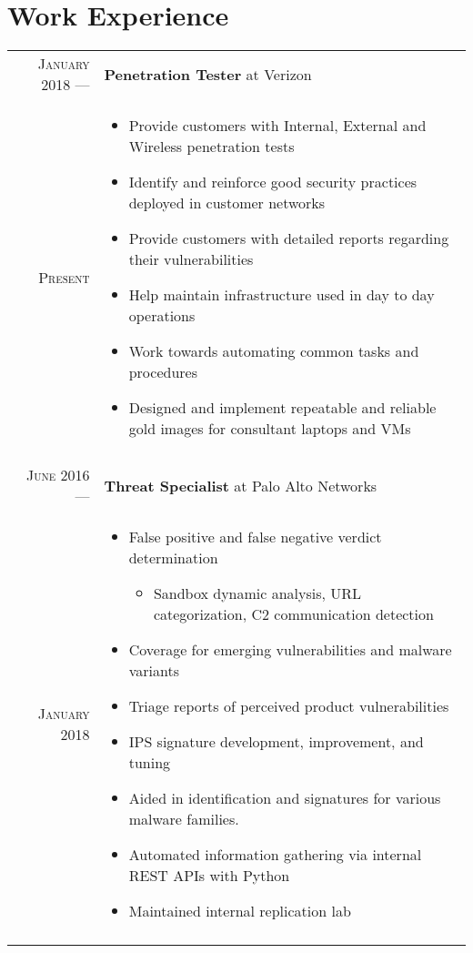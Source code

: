 \documentclass[a4paper,10pt]{article}
\begin{document}
\section{Work Experience}
\begin{tabular}{r|p{11cm}}

 \textsc{January 2018} ---            & \textbf {Penetration Tester} at Verizon \\
 \textsc{Present} \hphantom{---} & \footnotesize{
        \vspace{-2mm}
        \begin{itemize}[leftmargin=*]
            \item Provide customers with Internal, External and Wireless penetration tests
            \item Identify and reinforce good security practices deployed in customer networks
            \item Provide customers with detailed reports regarding their vulnerabilities
            \item Help maintain infrastructure used in day to day operations
            \item Work towards automating common tasks and procedures
            \item Designed and implement repeatable and reliable gold images for consultant laptops and VMs
        \end{itemize}
        \vspace*{-\baselineskip}
    }\\
 \multicolumn{2}{c}{} \\

 \textsc{June 2016} ---            & \textbf {Threat Specialist} at Palo Alto Networks \\
 \textsc{January 2018} \hphantom{---} & \footnotesize{
        \vspace{-2mm}
        \begin{itemize}[leftmargin=*]
            \item False positive and false negative verdict determination
            \begin{itemize}
                \item Sandbox dynamic analysis, URL categorization, C2 communication detection
            \end{itemize}
            \item Coverage for emerging vulnerabilities and malware variants
            \item Triage reports of perceived product vulnerabilities 
            \item IPS signature development, improvement, and tuning 
            \item Aided in identification and signatures for various malware families.
            \item Automated information gathering via internal REST APIs with Python
            \item Maintained internal replication lab
        \end{itemize}
        \vspace*{-\baselineskip}
    }\\
 \multicolumn{2}{c}{} \\


\end{tabular}
\end{document}
